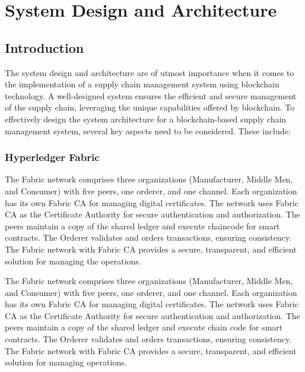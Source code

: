 
\chapter{System Design and Architecture}\doublespacing %

\label{Chapter5} %




\section{Introduction}
\noindent The system design and architecture are of utmost importance when it comes to the implementation of a supply chain management system using blockchain technology. A well-designed system ensures the efficient and secure management of the supply chain, leveraging the unique capabilities offered by blockchain.
To effectively design the system architecture for a blockchain-based supply chain management system, several key aspects need to be considered. These include:


\subsection{Hyperledger Fabric}
\noindent The Fabric network comprises three organizations (Manufacturer, Middle Men, and Consumer) with five peers, one orderer, and one channel. Each organization has its own Fabric CA for managing digital certificates. The network uses Fabric CA as the Certificate Authority for secure authentication and authorization. The peers maintain a copy of the shared ledger and execute chaincode for smart contracts. The Orderer validates and orders transactions, ensuring consistency. The Fabric network with Fabric CA provides a secure, transparent, and efficient solution for managing the operations.
% 



\noindent The Fabric network comprises three organizations (Manufacturer, Middle Men, and Consumer) with five peers, one orderer, 
and one channel. Each organization has its own Fabric CA for managing digital certificates. The network uses Fabric CA as 
the Certificate Authority for secure authentication and authorization. The peers maintain a copy of the shared ledger and 
execute chain code for smart contracts. The Orderer validates and orders transactions, ensuring consistency. The Fabric 
network with Fabric CA provides a secure, transparent, and efficient solution for managing operations.

